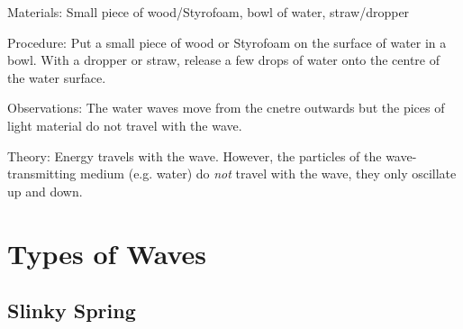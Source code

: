 \begin{multicols}{2}
\begin{description*}
\item[Materials:]{Small piece of wood/Styrofoam, bowl of water, straw/dropper}
\item[Procedure:]{Put a small piece of wood or Styrofoam on the surface of water in a bowl. With a dropper or straw, release a few drops of water onto the centre of the water surface.}
\item[Observations:]{The water waves move from the cnetre outwards but the pices of light material do not travel with the wave.}
\item[Theory:]{Energy travels with the wave. However, the particles of the wave-transmitting medium (e.g. water) do \emph{not} travel with the wave, they only oscillate up and down.}
\end{description*}


\section*{Types of Waves}


\subsection{Slinky Spring}



\end{multicols}

